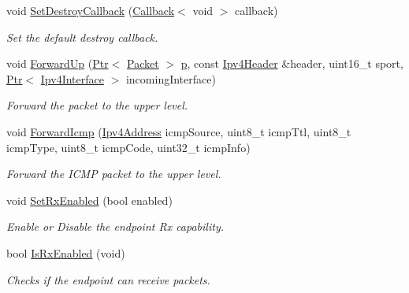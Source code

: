 \begin{DoxyCompactItemize}
void \hyperlink{classns3_1_1Ipv4EndPoint_a19ec16d98c501d3684e6549d7296ea0a}{Set\+Destroy\+Callback} (\hyperlink{classns3_1_1Callback}{Callback}$<$ void $>$ callback)
\begin{DoxyCompactList}\small\item\em Set the default destroy callback. \end{DoxyCompactList}\item 
void \hyperlink{classns3_1_1Ipv4EndPoint_a3a04ac06303dc1c4a47b16cdfababdb5}{Forward\+Up} (\hyperlink{classns3_1_1Ptr}{Ptr}$<$ \hyperlink{classns3_1_1Packet}{Packet} $>$ \hyperlink{lte__link__budget__x2__handover__measures_8m_ac9de518908a968428863f829398a4e62}{p}, const \hyperlink{classns3_1_1Ipv4Header}{Ipv4\+Header} \&header, uint16\+\_\+t sport, \hyperlink{classns3_1_1Ptr}{Ptr}$<$ \hyperlink{classns3_1_1Ipv4Interface}{Ipv4\+Interface} $>$ incoming\+Interface)
\begin{DoxyCompactList}\small\item\em Forward the packet to the upper level. \end{DoxyCompactList}\item 
void \hyperlink{classns3_1_1Ipv4EndPoint_a53cc03159a64a6aa2eed49382dc42381}{Forward\+Icmp} (\hyperlink{classns3_1_1Ipv4Address}{Ipv4\+Address} icmp\+Source, uint8\+\_\+t icmp\+Ttl, uint8\+\_\+t icmp\+Type, uint8\+\_\+t icmp\+Code, uint32\+\_\+t icmp\+Info)
\begin{DoxyCompactList}\small\item\em Forward the I\+C\+MP packet to the upper level. \end{DoxyCompactList}\item 
void \hyperlink{classns3_1_1Ipv4EndPoint_a76b96b25ce48190143a423b62645579c}{Set\+Rx\+Enabled} (bool enabled)
\begin{DoxyCompactList}\small\item\em Enable or Disable the endpoint Rx capability. \end{DoxyCompactList}\item 
bool \hyperlink{classns3_1_1Ipv4EndPoint_ac44ebf66d12180a1885e525d44c3d13f}{Is\+Rx\+Enabled} (void)
\begin{DoxyCompactList}\small\item\em Checks if the endpoint can receive packets. \end{DoxyCompactList}\end{DoxyCompactItemize}
